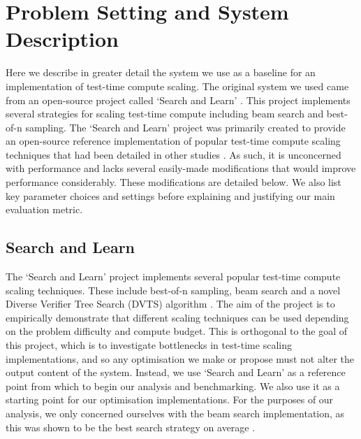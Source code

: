 \documentclass[11pt,twoside]{report}
\begin{document}
\chapter{Problem Setting and System Description}

Here we describe in greater detail the system we use as a baseline for an implementation of test-time compute scaling. 
The original system we used came from an open-source project called `Search and Learn' \cite{beeching2024scalingtesttimecompute}.
This project implements several strategies for scaling test-time compute including beam search and best-of-n sampling. 
The `Search and Learn' project was primarily created to provide an open-source reference implementation of popular test-time compute scaling techniques that had been detailed in other studies \cite{snell2024scaling}.
As such, it is unconcerned with performance and lacks several easily-made modifications that would improve performance considerably.
These modifications are detailed below. 
We also list key parameter choices and settings before explaining and justifying our main evaluation metric.

\section{Search and Learn}
The `Search and Learn' project implements several popular test-time compute scaling techniques. 
These include best-of-n sampling, beam search and a novel Diverse Verifier Tree Search (DVTS) algorithm \cite{beeching2024scalingtesttimecompute}.
The aim of the project is to empirically demonstrate that different scaling techniques can be used depending on the problem difficulty and compute budget.
This is orthogonal to the goal of this project, which is to investigate bottlenecks in test-time scaling implementations, and so any optimisation we make or propose must not alter the output content of the system. 
Instead, we use `Search and Learn' as a reference point from which to begin our analysis and benchmarking.
We also use it as a starting point for our optimisation implementations.
For the purposes of our analysis, we only concerned ourselves with the beam search implementation, as this was shown to be the best search strategy on average \cite{beeching2024scalingtesttimecompute}.
\end{document}
